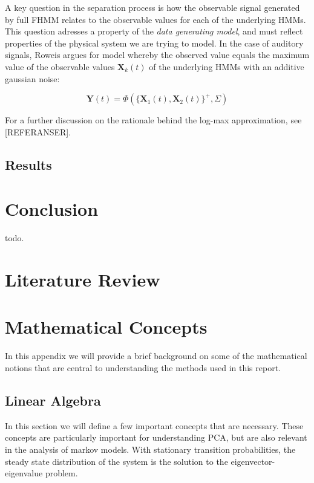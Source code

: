 \documentclass[11pt, oneside, a4paper]{report}
\begin{document}
A key question in the separation process is how the observable signal
generated by full FHMM relates to the observable values for each of
the underlying HMMs. This question adresses a property of the
\emph{data generating model}, and must reflect properties of the
physical system we are trying to model. In the case of auditory
signals, Roweis argues for model whereby the observed value equals the
maximum value of the observable values $\mathbf{X}_k(t)$ of the
underlying HMMs with an additive gaussian noise:


\begin{equation}
  \mathbf{Y}(t) = \Phi(\{\mathbf{X}_1(t), \mathbf{X}_2(t)\}^{+}, \Sigma)
\end{equation}

For a further discussion on the rationale behind the log-max
approximation, see [REFERANSER].




\section{Results}



\chapter{Conclusion}

todo.

\appendix

\chapter{Literature Review}


\chapter{Mathematical Concepts}

In this appendix we will provide a brief background on some of the mathematical notions that are central to understanding the methods used in this report. 

\section{Linear Algebra}

In this section we will define a few important concepts that are
necessary. These concepts are particularly important for understanding
PCA, but are also relevant in the analysis of markov models. With
stationary transition probabilities, the steady state distribution of
the system is the solution to the eigenvector-eigenvalue problem.
\end{document}

